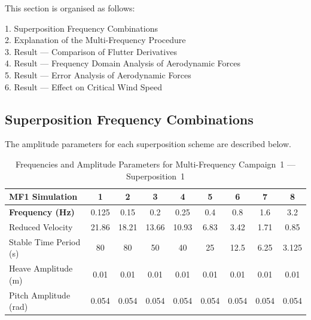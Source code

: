 \documentclass[../main]{subfiles}
\begin{document}
This section is organised as follows:

\begin{flushleft}
\hspace{2cm}1. Superposition Frequency Combinations \\
\hspace{2cm}2. Explanation of the Multi-Frequency Procedure \\
\hspace{2cm}3. Result --- Comparison of Flutter Derivatives \\
\hspace{2cm}4. Result --- Frequency Domain Analysis of Aerodynamic Forces \\
\hspace{2cm}5. Result --- Error Analysis of Aerodynamic Forces \\
\hspace{2cm}6. Result --- Effect on Critical Wind Speed \\
\end{flushleft}

\subsection{Superposition Frequency Combinations}

The amplitude parameters for each superposition scheme are described below.

\begin{table}[htbp]
\centering
\caption{Frequencies and Amplitude Parameters for Multi-Frequency Campaign~1 --- Superposition~1}
\label{tab:MF1_SP1}
\begin{tabular}{|l|c|c|c|c|c|c|c|c|}
\hline
\rule{0pt}{12pt}\textbf{MF1 Simulation} & 1 & 2 & 3 & 4 & 5 & 6 & 7 & 8 \\[4pt]
\hline
\rule{0pt}{12pt}\textbf{Frequency (Hz)} & 0.125 & 0.15 & 0.2 & 0.25 & 0.4 & 0.8 & 1.6 & 3.2 \\[4pt]
\hline
Reduced Velocity        & 21.86 & 18.21 & 13.66 & 10.93 & 6.83 & 3.42 & 1.71 & 0.85 \\
Stable Time Period (s)  & 80    & 80    & 50    & 40    & 25   & 12.5 & 6.25 & 3.125 \\
Heave Amplitude (m)     & 0.01 & 0.01 & 0.01 & 0.01 & 0.01 & 0.01 & 0.01 & 0.01 \\
Pitch Amplitude (rad)   & 0.054 & 0.054 & 0.054 & 0.054 & 0.054 & 0.054 & 0.054 & 0.054 \\
\hline
\end{tabular}
\end{table}
\end{document}
